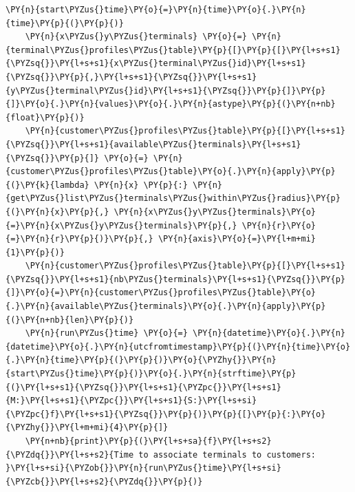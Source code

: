 \begin{tcolorbox}[breakable, size=fbox, boxrule=1pt, pad at break*=1mm,colback=cellbackground, colframe=cellborder]
\begin{Verbatim}[commandchars=\\\{\}]
    \PY{n}{start\PYZus{}time}\PY{o}{=}\PY{n}{time}\PY{o}{.}\PY{n}{time}\PY{p}{(}\PY{p}{)}
    \PY{n}{x\PYZus{}y\PYZus{}terminals} \PY{o}{=} \PY{n}{terminal\PYZus{}profiles\PYZus{}table}\PY{p}{[}\PY{p}{[}\PY{l+s+s1}{\PYZsq{}}\PY{l+s+s1}{x\PYZus{}terminal\PYZus{}id}\PY{l+s+s1}{\PYZsq{}}\PY{p}{,}\PY{l+s+s1}{\PYZsq{}}\PY{l+s+s1}{y\PYZus{}terminal\PYZus{}id}\PY{l+s+s1}{\PYZsq{}}\PY{p}{]}\PY{p}{]}\PY{o}{.}\PY{n}{values}\PY{o}{.}\PY{n}{astype}\PY{p}{(}\PY{n+nb}{float}\PY{p}{)}
    \PY{n}{customer\PYZus{}profiles\PYZus{}table}\PY{p}{[}\PY{l+s+s1}{\PYZsq{}}\PY{l+s+s1}{available\PYZus{}terminals}\PY{l+s+s1}{\PYZsq{}}\PY{p}{]} \PY{o}{=} \PY{n}{customer\PYZus{}profiles\PYZus{}table}\PY{o}{.}\PY{n}{apply}\PY{p}{(}\PY{k}{lambda} \PY{n}{x} \PY{p}{:} \PY{n}{get\PYZus{}list\PYZus{}terminals\PYZus{}within\PYZus{}radius}\PY{p}{(}\PY{n}{x}\PY{p}{,} \PY{n}{x\PYZus{}y\PYZus{}terminals}\PY{o}{=}\PY{n}{x\PYZus{}y\PYZus{}terminals}\PY{p}{,} \PY{n}{r}\PY{o}{=}\PY{n}{r}\PY{p}{)}\PY{p}{,} \PY{n}{axis}\PY{o}{=}\PY{l+m+mi}{1}\PY{p}{)}
    \PY{n}{customer\PYZus{}profiles\PYZus{}table}\PY{p}{[}\PY{l+s+s1}{\PYZsq{}}\PY{l+s+s1}{nb\PYZus{}terminals}\PY{l+s+s1}{\PYZsq{}}\PY{p}{]}\PY{o}{=}\PY{n}{customer\PYZus{}profiles\PYZus{}table}\PY{o}{.}\PY{n}{available\PYZus{}terminals}\PY{o}{.}\PY{n}{apply}\PY{p}{(}\PY{n+nb}{len}\PY{p}{)}
    \PY{n}{run\PYZus{}time} \PY{o}{=} \PY{n}{datetime}\PY{o}{.}\PY{n}{datetime}\PY{o}{.}\PY{n}{utcfromtimestamp}\PY{p}{(}\PY{n}{time}\PY{o}{.}\PY{n}{time}\PY{p}{(}\PY{p}{)}\PY{o}{\PYZhy{}}\PY{n}{start\PYZus{}time}\PY{p}{)}\PY{o}{.}\PY{n}{strftime}\PY{p}{(}\PY{l+s+s1}{\PYZsq{}}\PY{l+s+s1}{\PYZpc{}}\PY{l+s+s1}{M:}\PY{l+s+s1}{\PYZpc{}}\PY{l+s+s1}{S:}\PY{l+s+si}{\PYZpc{}f}\PY{l+s+s1}{\PYZsq{}}\PY{p}{)}\PY{p}{[}\PY{p}{:}\PY{o}{\PYZhy{}}\PY{l+m+mi}{4}\PY{p}{]}
    \PY{n+nb}{print}\PY{p}{(}\PY{l+s+sa}{f}\PY{l+s+s2}{\PYZdq{}}\PY{l+s+s2}{Time to associate terminals to customers: }\PY{l+s+si}{\PYZob{}}\PY{n}{run\PYZus{}time}\PY{l+s+si}{\PYZcb{}}\PY{l+s+s2}{\PYZdq{}}\PY{p}{)}


\end{Verbatim}
\end{tcolorbox}
